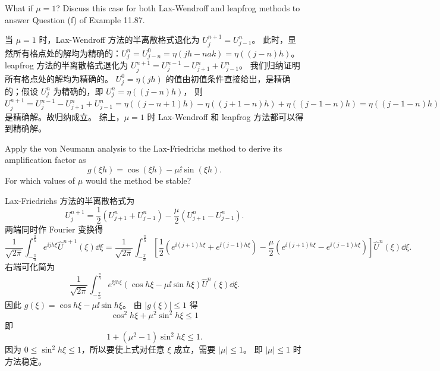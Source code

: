 \documentclass[lang=cn,a4paper,newtx,bibend=bibtex]{elegantpaper}
\begin{document}
\begin{prob}[Exercise 11.94]
  What if $\mu=1$? Discuss this case for both Lax-Wendroff and leapfrog methods
  to answer Question (f) of Example 11.87.
\end{prob}

\begin{solution}
  当 $\mu=1$ 时，Lax-Wendroff 方法的半离散格式退化为 $U_j^{n+1} = U_{j-1}^n$。
  此时，显然所有格点处的解均为精确的：$U_j^n = U_{j-n}^0 = \eta(jh-nak) = \eta((j-n)h)$。
  leapfrog 方法的半离散格式退化为 $U_j^{n+1} = U_j^{n-1} - U_{j+1}^n + U_{j-1}^n$。
  我们归纳证明所有格点处的解均为精确的。
  $U_j^0 = \eta(jh)$ 的值由初值条件直接给出，是精确的；假设 $U_j^n$ 为精确的，即 $U_j^n = \eta((j-n)h)$，
  则 $U_j^{n+1} = U_j^{n-1} - U_{j+1}^n + U_{j-1}^n = \eta((j-n+1)h) - \eta((j+1-n)h) + \eta((j-1-n)h) = \eta((j-1-n)h)$
  是精确解。故归纳成立。
  综上，$\mu=1$ 时 Lax-Wendroff 和 leapfrog 方法都可以得到精确解。
\end{solution}

\begin{prob}[Exercise 11.96]
  Apply the von Neumann analysis to the Lax-Friedrichs method to derive its amplification factor as
  \begin{equation*}
    g(\xi h) = \cos(\xi h) - \mu\ii\sin(\xi h).
  \end{equation*}
  For which values of $\mu$ would the method be stable?
\end{prob}

\begin{solution}
  Lax-Friedrichs 方法的半离散格式为
  \begin{equation*}
    U_j^{n+1} = \dfrac 12(U_{j+1}^n + U_{j-1}^n) - \dfrac{\mu}2(U_{j+1}^n - U_{j-1}^n).
  \end{equation*}
  两端同时作 Fourier 变换得
  \begin{equation*}
    \dfrac 1{\sqrt{2\pi}}\int_{-\frac{\pi}h}^{\frac{\pi}h}e^{\ii jh\xi}\hat{U}^{n+1}(\xi)\dd\xi
    = \dfrac 1{\sqrt{2\pi}}\int_{-\frac{\pi}h}^{\frac{\pi}h}\left[\dfrac 12(e^{\ii(j+1)h\xi} + e^{\ii(j-1)h\xi}) - \dfrac{\mu}2(e^{\ii(j+1)h\xi} - e^{\ii(j-1)h\xi})\right]\hat{U}^n(\xi)\dd\xi.
  \end{equation*}
  右端可化简为
  \begin{equation*}
    \dfrac 1{\sqrt{2\pi}}\int_{-\frac{\pi}h}^{\frac{\pi}h}e^{\ii jh\xi}(\cos h\xi - \mu\ii\sin h\xi)\hat{U}^n(\xi)\dd\xi.
  \end{equation*}
  因此 $g(\xi) = \cos h\xi - \mu\ii\sin h\xi$。
  由 $|g(\xi)|\leq 1$ 得
  \begin{equation*}
    \cos^2 h\xi + \mu^2\sin^2 h\xi \leq 1
  \end{equation*}
  即
  \begin{equation*}
    1 + (\mu^2-1)\sin^2 h\xi \leq 1.
  \end{equation*}
  因为 $0\leq \sin^2 h\xi \leq 1$，所以要使上式对任意 $\xi$ 成立，需要 $|\mu|\leq 1$。
  即 $|\mu|\leq 1$ 时方法稳定。
\end{solution}
\end{document}
